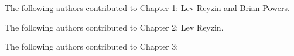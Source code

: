 \noindent The following authors contributed to Chapter 1: Lev Reyzin and Brian Powers.

\noindent The following authors contributed to Chapter 2: Lev Reyzin. 

\noindent The following authors contributed to Chapter 3: 
